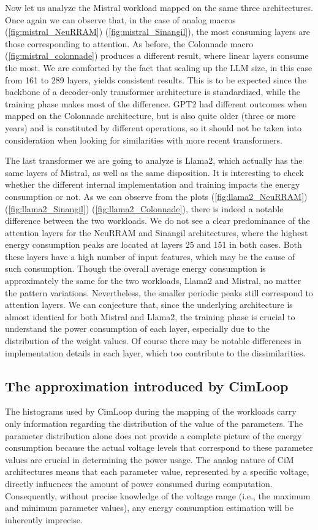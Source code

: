 \documentclass[conference]{IEEEtran}
\begin{document}
Now let us analyze the Mistral workload mapped on the same three architectures. Once again we can observe that, in the case of analog macros (\ref{fig:mistral_NeuRRAM}) (\ref{fig:mistral_Sinangil}), the most consuming layers are those corresponding to attention. As before, the Colonnade macro (\ref{fig:mistral_colonnade}) produces a different result, where linear layers consume the most. We are comforted by the fact that scaling up the LLM size, in this case from 161 to 289 layers, yields consistent results. This is to be expected since the backbone of a decoder-only transformer architecture is standardized, while the training phase makes most of the difference. GPT2 had different outcomes when mapped on the Colonnade architecture, but is also quite older (three or more years) and is constituted by different operations, so it should not be taken into consideration when looking for similarities with more recent transformers. 

The last transformer we are going to analyze is Llama2, which actually has the same layers of Mistral, as well as the same disposition. It is interesting to check whether the different internal implementation and training impacts the energy consumption or not. As we can observe from the plots (\ref{fig:llama2_NeuRRAM}) (\ref{fig:llama2_Sinangil}) (\ref{fig:llama2_Colonnade}), there is indeed a notable difference between the two workloads. We do not see a clear predominance of the attention layers for the NeuRRAM and Sinangil architectures, where the highest energy consumption peaks are located at layers 25 and 151 in both cases. Both these layers have a high number of input features, which may be the cause of such consumption. Though the overall average energy consumption is approximately the same for the two workloads, Llama2 and Mistral, no matter the pattern variations. Nevertheless, the smaller periodic peaks still correspond to attention layers. 
We can conjecture that, since the underlying architecture is almost identical for both Mistral and Llama2, the training phase is crucial to understand the power consumption of each layer, especially due to the distribution of the weight values. Of course there may be notable differences in implementation details in each layer, which too contribute to the dissimilarities. 

\subsection{The approximation introduced by CimLoop}
The histograms used by CimLoop during the mapping of the workloads carry only information regarding the distribution of the value of the parameters. The parameter distribution alone does not provide a complete picture of the energy consumption because the actual voltage levels that correspond to these parameter values are crucial in determining the power usage. The analog nature of CiM architectures means that each parameter value, represented by a specific voltage, directly influences the amount of power consumed during computation. Consequently, without precise knowledge of the voltage range (i.e., the maximum and minimum parameter values), any energy consumption estimation will be inherently imprecise.
\end{document}
